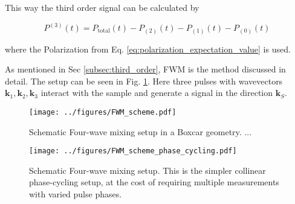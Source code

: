 This way the third order signal can be calculated by 

\begin{equation}
	P^{(3)}(t) = P_{\text{total}}(t) - P_{(2)}(t) - P_{(1)}(t) - P_{(0)}(t)
	\label{eq:third_order_signal_numerical}
\end{equation}

\noindent
where the Polarization from Eq. \eqref{eq:polarization_expectation_value} is used. 

\noindent
As mentioned in Sec \ref{subsec:third_order}, FWM is the method discussed in detail. The setup can be seen in Fig. \ref{fig:fwm_box_car_setup}. Here three pulses with wavevectors $\mathbf{k}_1, \mathbf{k}_2, \mathbf{k}_3$ interact with the sample and generate a signal in the direction $\mathbf{k}_S$. 

\begin{figure}[ht]
	\centering
	\texttt{[image: ../figures/FWM\_scheme.pdf]}
	\caption{Schematic Four-wave mixing setup in a Boxcar geometry. ... }
	\label{fig:fwm_box_car_setup}
\end{figure}

\begin{figure}[ht]
	\centering
	\texttt{[image: ../figures/FWM\_scheme\_phase\_cycling.pdf]}
	\caption{Schematic Four-wave mixing setup. This is the simpler collinear phase-cycling setup, at the cost of requiring multiple measurements with varied pulse phases.
	}
	\label{fig:fwm_phase_cycling_setup}
\end{figure}







